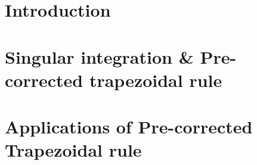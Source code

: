 \documentclass[12pt,a4paper,bold]{thesis}
\theoremstyle{plain}
\theoremstyle{definition}
\newcommand{\CHAPTER}[1]
{\newpage
	\vspace{3em}
	\begin{center}
		\LARGE{\MakeUppercase{\textbf{#1}}}
	\end{center}
	\vspace{3em}
}
\begin{document}
	\mainmatter 
	
	\chapter{Introduction}
	
	
	
	
	\chapter{Singular integration \& Pre-corrected trapezoidal rule}
	  
	
	
	\chapter{Applications of Pre-corrected Trapezoidal rule }
	
	
	
	
	
	\nocite{arnold2001concise,atkinson2008introduction,epperson2013introduction,colton1998inverse}
	\nocite{kapur1997high,rokhlin1990end}
	
	
	
	
	
	
\end{document}
